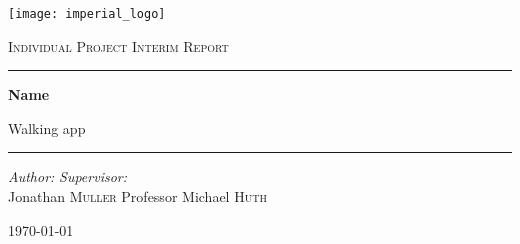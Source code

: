 \begin{titlepage}
    \begin{center}
        \vspace*{2cm}
        \texttt{[image: imperial\_logo]}
        \vspace{2cm}
        
        \LARGE
        \textsc{Individual Project Interim Report}
        
        \vspace{2cm}
        \hrule
        \vspace{0.5cm}
        
        \huge
        \textbf{Name}
        
        \vspace{0.2cm}
        
        \LARGE
        Walking app
        
        \vspace{0.5cm}
        \hrule
        \vspace{2cm}
        
        \begin{flushleft}
            \Large
            \textit{Author:}
            \hfill
            \textit{Supervisor:}\\
            Jonathan \textsc{Muller}
            \hfill
            Professor Michael \textsc{Huth}\\
        \end{flushleft}
        
        \vfill
        \Large
        \today
    \end{center}
\end{titlepage}